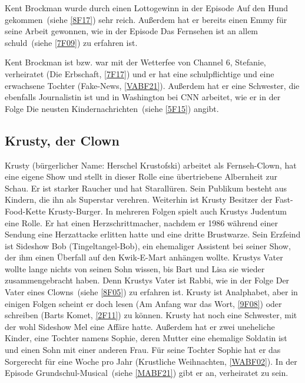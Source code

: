 Kent Brockman wurde durch einen Lottogewinn in der Episode \glqq Auf den Hund gekommen\grqq\ (siehe \ref{8F17}) sehr reich. Außerdem hat er bereits einen Emmy für seine Arbeit gewonnen, wie in der Episode \glqq Das Fernsehen ist an allem schuld\grqq\ (siehe \ref{7F09}) zu erfahren ist.

Kent Brockman ist bzw. war mit der Wetterfee von Channel 6, Stefanie, verheiratet (\glqq Die Erbschaft\grqq , \ref{7F17}) und er hat eine schulpflichtige und eine erwachsene Tochter (\glqq Fake-News\grqq, \ref{VABF21}). Außerdem hat er eine Schwester, die ebenfalls Journalistin ist und in Washington bei CNN arbeitet, wie er in der Folge \glqq Die neusten Kindernachrichten\grqq\ (siehe \ref{5F15}) angibt.


\subsection{Krusty, der Clown}\label{HerschelKrustofski}
Krusty (bürgerlicher Name: Herschel Krustofski) arbeitet als Fernseh-Clown, hat eine eigene Show und stellt in dieser Rolle eine übertriebene Albernheit zur Schau. Er ist starker Raucher und hat Starallüren. Sein Publikum besteht aus Kindern, die ihn als Superstar verehren. Weiterhin ist Krusty Besitzer der Fast-Food-Kette Krusty-Burger. In mehreren Folgen spielt auch Krustys Judentum eine Rolle. Er hat einen Herzschrittmacher, nachdem er 1986 während einer Sendung eine Herzattacke erlitten hatte und eine dritte Brustwarze. Sein Erzfeind ist Sideshow Bob (Tingeltangel-Bob), ein ehemaliger Assistent bei seiner Show, der ihm einen Überfall auf den Kwik-E-Mart anhängen wollte. Krustys Vater wollte lange nichts von seinen Sohn wissen, bis Bart und Lisa sie wieder zusammengebracht haben. Denn Krustys Vater ist Rabbi, wie in der Folge \glqq Der Vater eines Clowns\grqq\ (siehe \ref{8F05}) zu erfahren ist. Krusty ist Analphabet, aber in einigen Folgen scheint er doch lesen (\glqq Am Anfang war das Wort\grqq , \ref{9F08}) oder schreiben (\glqq Barts Komet\grqq , \ref{2F11}) zu können. Krusty hat noch eine Schwester, mit der wohl Sideshow Mel eine Affäre hatte. Außerdem hat er zwei uneheliche Kinder, eine Tochter namens Sophie, deren Mutter eine ehemalige Soldatin ist und einen Sohn mit einer anderen Frau. Für seine Tochter Sophie hat er das Sorgerecht für eine Woche pro Jahr (\glqq Krustliche Weihnachten\grqq, \ref{WABF02}). In der Episode \glqq Grundschul-Musical\grqq\ (siehe \ref{MABF21}) gibt er an, verheiratet zu sein.

